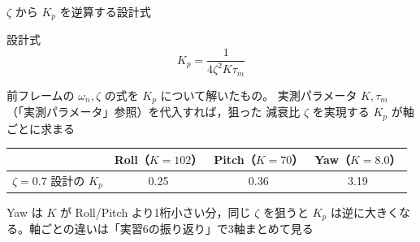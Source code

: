 \begin{frame}{$\zeta$ から $K_p$ を逆算する設計式\later}
  \begin{block}{設計式}
    \[
      K_p = \frac{1}{4\zeta^2 K \tau_m}
    \]
  \end{block}

  \vspace{0.3em}

  {\footnotesize 前フレームの $\omega_n,\zeta$ の式を $K_p$ について解いたもの。
  実測パラメータ $K,\tau_m$（「実測パラメータ」参照）を代入すれば，狙った
  減衰比 $\zeta$ を実現する $K_p$ が軸ごとに求まる}

  \vspace{0.5em}

  \begin{table}
    \centering\footnotesize
    \begin{tabular}{lccc}
      \hline
      & \textbf{Roll（$K=102$）} & \textbf{Pitch（$K=70$）} & \textbf{Yaw（$K=8.0$）} \\
      \hline
      $\zeta=0.7$ 設計の $K_p$ & 0.25 & 0.36 & 3.19 \\
      \hline
    \end{tabular}
  \end{table}

  \vspace{0.3em}

  {\footnotesize Yaw は $K$ が Roll/Pitch より1桁小さい分，同じ $\zeta$ を狙うと
  $K_p$ は逆に大きくなる。軸ごとの違いは「実習6の振り返り」で3軸まとめて見る}
\end{frame}

